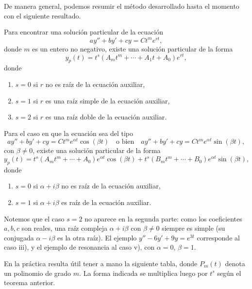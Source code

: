De manera general, podemos resumir el m\'etodo desarrollado hasta el momento con el siguiente resultado.

\begin{theorem}
    Para encontrar una soluci\'on particular de la ecuaci\'on
    \[
    ay''+by'+cy=Ct^me^{rt},
    \]
    donde $m$ es un entero no negativo, existe una soluci\'on particular de la forma
    \[
    y_p(t)=t^{s}\left(A_mt^m+\cdots+A_1t+A_0\right)e^{rt},
    \]
    donde
    \begin{enumerate}[label=\roman*)]
        \item $s=0$ si $r$ no es ra\'iz de la ecuaci\'on auxiliar,
        \item $s=1$ si $r$ es una ra\'iz simple de la ecuaci\'on auxiliar,
        \item $s=2$ si $r$ es una ra\'iz doble de la ecuaci\'on auxiliar.
    \end{enumerate}

    Para el caso en que la ecuaci\'on sea del tipo
    \[
    ay''+by'+cy=Ct^me^{\alpha t}\cos(\beta t)\quad \text{o bien}\quad ay''+by'+cy=Ct^me^{\alpha t}\sin(\beta t),
    \]
    con $\beta\neq 0$, existe una soluci\'on particular de la forma
    \[
    y_p(t)=t^s\left(A_mt^m+\cdots+A_0\right)e^{\alpha t}\cos(\beta t)+t^s\left(B_mt^m+\cdots+B_0\right)e^{\alpha t}\sin(\beta t),
    \]
    donde
    \begin{enumerate}[label=\roman*),resume]
        \item $s=0$ si $\alpha+i\beta$ no es ra\'iz de la ecuaci\'on auxiliar,
        \item $s=1$ si $\alpha+i\beta$ es ra\'iz de la ecuaci\'on auxiliar.
    \end{enumerate}
\end{theorem}

Notemos que el caso $s=2$ no aparece en la segunda parte: como los coeficientes $a,b,c$ son reales, una ra\'iz compleja $\alpha+i\beta$ con $\beta\neq0$ siempre es simple (su conjugada $\alpha-i\beta$ es la otra ra\'iz). El ejemplo $y''-6y'+9y=e^{3t}$ corresponde al caso iii), y el ejemplo de resonancia al caso v), con $\alpha=0$, $\beta=1$.

En la pr\'actica resulta \'util tener a mano la siguiente tabla, donde $P_m(t)$ denota un polinomio de grado $m$. La forma indicada se multiplica luego por $t^s$ seg\'un el teorema anterior.

